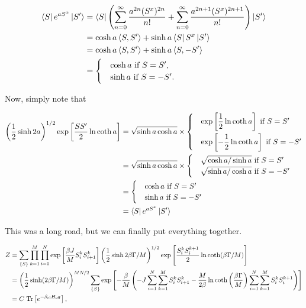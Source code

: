 \documentclass[11pt,openany]{article}
\begin{document}
\begin{align*}
	\bra{S}e^{aS^x}\ket{S'} &= \bra{S}\left(\sum_{n=0}^\infty\frac{a^{2n}(S^x)^{2n}}{n!} + \sum_{n=0}^\infty\frac{a^{2n+1}(S^x)^{2n+1}}{n!}\right)\ket{S'}\\
	&= \cosh{a}\braket{S,S'} + \sinh{a}\bra{S}S^x\ket{S'}\\
	&= \cosh{a}\braket{S,S'} + \sinh{a}\braket{S,-S'}\\
	&= \begin{cases}
		&\cosh{a} \text{ if } S=S',\\
		&\sinh{a} \text{ if } S=-S'.
	\end{cases}
\end{align*}

Now, simply note that

\begin{align*}
	\left(\frac{1}{2}\sinh{2a}\right)^{1/2}\exp\left[\frac{SS'}{2}\ln\coth{a}\right] &= \sqrt{\sinh{a}\cosh{a}}\times
		\begin{cases}
			&\exp\left[\dfrac{1}{2}\ln\coth{a}\right] \text{ if } S=S'			\vspace{1mm}\\
			&\exp\left[-\dfrac{1}{2}\ln\coth{a}\right] \text{ if } S=-S'
		\end{cases}\\
	& = \sqrt{\sinh{a}\cosh{a}}\times
	\begin{cases}
		&\sqrt{\cosh{a}/\sinh{a}} \text{ if } S=S'\\
		&\sqrt{\sinh{a}/\cosh{a}} \text{ if } S=-S'
	\end{cases}\\
	&= \begin{cases}
		&\cosh{a} \text{ if } S=S'\\
		&\sinh{a} \text{ if } S=-S'
	\end{cases}\\
	&= \bra{S}e^{aS^x}\ket{S'}
\end{align*}

This was a long road, but we can finally put everything together.

\begin{align*}
	Z &= \sum_{\left\{S\right\}}\prod_{k=1}^M\prod_{i=1}^N\exp\left[\frac{\beta J}{M}S_i^kS_{i+1}^k\right]\left(\frac{1}{2}\sinh{2\beta\Gamma/M}\right)^{1/2}\exp\left[\frac{S_i^kS_i^{k+1}}{2}\ln\coth(\beta\Gamma/M)\right]\\
	&= \left(\frac{1}{2}\sinh(2\beta\Gamma/M)\right)^{MN/2}\sum_{\left\{S\right\}}\exp\left[-\frac{\beta}{M}\left(-J\sum_{i=1}^N\sum_{k=1}^M S_i^k S_{i+1}^k - \frac{M}{2\beta}\ln\coth\left(\dfrac{\beta\Gamma}{M}\right)\sum_{i=1}^N\sum_{k=1}^M S_i^k S_i^{k+1}\right)\right]\\
	&= C\hspace{1mm}\mathrm{Tr}\left[e^{-\beta_\mathrm{cl}H_\mathrm{eff}}\right],
\end{align*}
\end{document}
